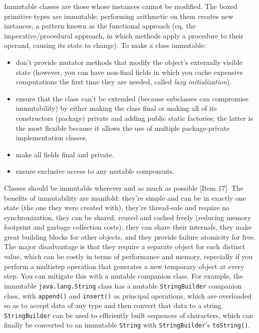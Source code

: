 \documentclass[8pt, table, xcdraw]{article}%
\begin{document}
Immutable classes are those whose instances cannot be modified. The boxed primitive types are immutable; performing arithmetic on them creates new instances, a pattern known as the functional approach (cq. the imperative/procedural approach, in which methods apply a procedure to their operand, causing its state to change). To make a class immutable:

\begin{itemize}
    \item don't provide mutator methods that modify the object's externally visible state (however, you can have non-final fields in which you cache expensive computations the first time they are needed, called \emph{lazy initialization}).
    \item ensure that the class can't be extended (because subclasses can compromise immutability) by either making the class final or making all of its constructors (package) private and adding public static factories; the latter is the most flexible because it allows the use of multiple package-private implementation classes.
    \item make all fields final and private.
    \item ensure exclusive access to any mutable components.
\end{itemize}

Classes should be immutable wherever and as much as possible [Item 17]. The benefits of immutability are manifold: they're simple and can be in exactly one state (the one they were created with), they're thread-safe and require no synchronization, they can be shared, reused and cached freely (reducing memory footprint and garbage collection costs), they can share their internals, they make great building blocks for other objects, and they provide failure atomicity for free. The major disadvantage is that they require a separate object for each distinct value, which can be costly in terms of performance and memory, especially if you perform a multistep operation that generates a new temporary object at every step. You can mitigate this with a mutable companion class. For example, the immutable \lstinline{java.lang.String} class has a mutable \lstinline{StringBuilder} companion class, with \lstinline{append()} and \lstinline{insert()} as principal operations, which are overloaded so as to accept data of any type and then convert that data to a string. \lstinline{StringBuilder} can be used to efficiently built sequences of characters, which can finally be converted to an immutable \lstinline{String} with \lstinline{StringBuilder}'s \lstinline{toString()}.
\end{document}
